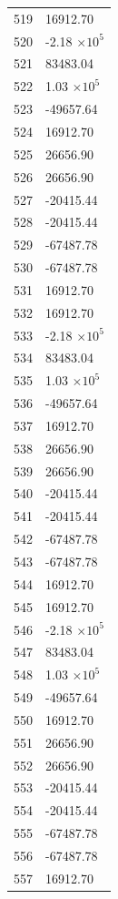 \documentclass[a4paper,11pt]{article}
\begin{document}
\begin{center}
\begin{longtable}{|R{1.5cm}|R{2.6cm}|}
  519 &     16912.70 \\
  520 &        -2.18 $\times 10^{           5}$ \\
  521 &     83483.04 \\
  522 &         1.03 $\times 10^{           5}$ \\
  523 &    -49657.64 \\
  524 &     16912.70 \\
  525 &     26656.90 \\
  526 &     26656.90 \\
  527 &    -20415.44 \\
  528 &    -20415.44 \\
  529 &    -67487.78 \\
  530 &    -67487.78 \\
  531 &     16912.70 \\
  532 &     16912.70 \\
  533 &        -2.18 $\times 10^{           5}$ \\
  534 &     83483.04 \\
  535 &         1.03 $\times 10^{           5}$ \\
  536 &    -49657.64 \\
  537 &     16912.70 \\
  538 &     26656.90 \\
  539 &     26656.90 \\
  540 &    -20415.44 \\
  541 &    -20415.44 \\
  542 &    -67487.78 \\
  543 &    -67487.78 \\
  544 &     16912.70 \\
  545 &     16912.70 \\
  546 &        -2.18 $\times 10^{           5}$ \\
  547 &     83483.04 \\
  548 &         1.03 $\times 10^{           5}$ \\
  549 &    -49657.64 \\
  550 &     16912.70 \\
  551 &     26656.90 \\
  552 &     26656.90 \\
  553 &    -20415.44 \\
  554 &    -20415.44 \\
  555 &    -67487.78 \\
  556 &    -67487.78 \\
  557 &     16912.70 \\

\end{longtable}
\end{center}
\end{document}
